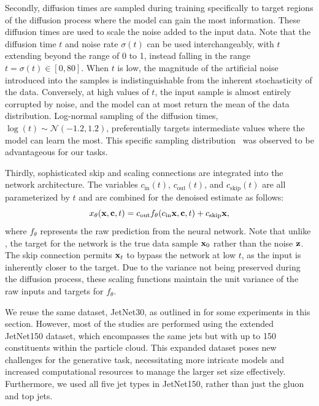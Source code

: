 Secondly, diffusion times are sampled during training specifically to target regions of the diffusion process where the model can gain the most information.
These diffusion times are used to scale the noise added to the input data.
Note that the diffusion time $t$ and noise rate $\sigma(t)$ can be used interchangeably, with $t$ extending beyond the range of 0 to 1, instead falling in the range $t = \sigma(t) \in [0, 80]$.
When $t$ is low, the magnitude of the artificial noise introduced into the samples is indistinguishable from the inherent stochasticity of the data.
Conversely, at high values of $t$, the input sample is almost entirely corrupted by noise, and the model can at most return the mean of the data distribution.
Log-normal sampling of the diffusion times, ${\log(t)\sim\mathcal{N}\left(-1.2, 1.2\right)}$, preferentially targets intermediate values where the model can learn the most.
This specific sampling distribution~\cite{ElucidatingDesignSpace} was observed to be advantageous for our tasks.

Thirdly, sophisticated skip and scaling connections are integrated into the network architecture.
The variables $c_\mathrm{in}(t)$, $c_\mathrm{out}(t)$, and $c_\mathrm{skip}(t)$ are all parameterized by $t$ and are combined for the denoised estimate as follows:
\begin{equation}
    x_\theta(\mathbf{x}, \mathbf{c}, t) = c_\mathrm{out} f_\theta(c_\mathrm{in}\mathbf{x}, \mathbf{c}, t) + c_\mathrm{skip}\mathbf{x},
\end{equation}
where $f_\theta$ represents the raw prediction from the neural network.
Note that unlike \pcjedi, the target for the network is the true data sample $\mathbf{x}_0$ rather than the noise $\mathbf{z}$.
The skip connection permits $\mathbf{x}_t$ to bypass the network at low $t$, as the input is inherently closer to the target.
Due to the variance not being preserved during the diffusion process, these  scaling functions maintain the unit variance of the raw inputs and targets
for $f_\theta$.

We reuse the same dataset, JetNet30, as outlined in  for some experiments in this section.
However, most of the studies are performed using the extended JetNet150 dataset, which encompasses the same jets but with up to 150 constituents within the particle cloud.
This expanded dataset poses new challenges for the generative task, necessitating more intricate models and increased computational resources to manage the larger set size effectively.
Furthermore, we used all five jet types in JetNet150, rather than just the gluon and top jets.

